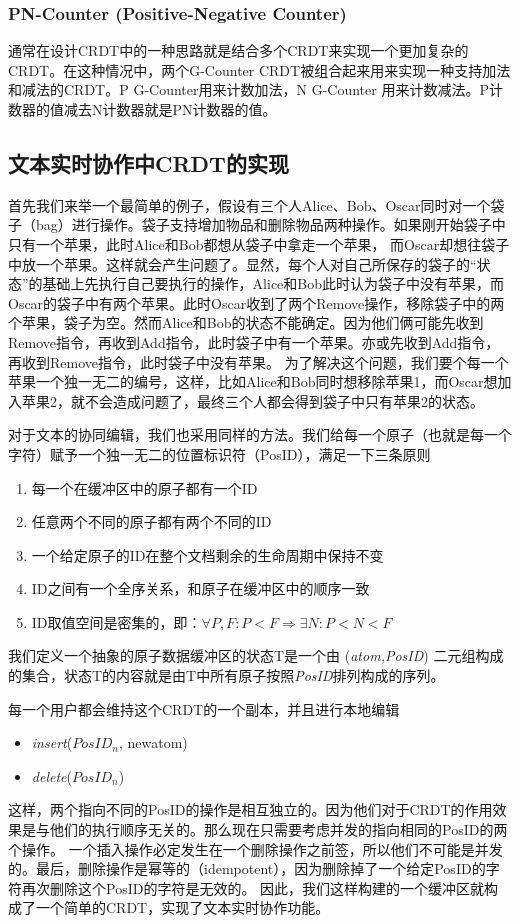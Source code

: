 \documentclass[11pt]{ctexart}
\begin{document}
\subsubsection{PN-Counter (Positive-Negative Counter)}
通常在设计CRDT中的一种思路就是结合多个CRDT来实现一个更加复杂的CRDT。在这种情况中，两个G-Counter CRDT被组合起来用来实现一种支持加法和减法的CRDT。P G-Counter用来计数加法，N G-Counter
用来计数减法。P计数器的值减去N计数器就是PN计数器的值。
\subsection{文本实时协作中CRDT的实现}
首先我们来举一个最简单的例子，假设有三个人Alice、Bob、Oscar同时对一个袋子（bag）进行操作。袋子支持增加物品和删除物品两种操作。如果刚开始袋子中只有一个苹果，此时Alice和Bob都想从袋子中拿走一个苹果，
而Oscar却想往袋子中放一个苹果。这样就会产生问题了。显然，每个人对自己所保存的袋子的“状态”的基础上先执行自己要执行的操作，Alice和Bob此时认为袋子中没有苹果，而Oscar的袋子中有两个苹果。此时Oscar收到了两个Remove操作，移除袋子中的两个苹果，袋子为空。然而Alice和Bob的状态不能确定。因为他们俩可能先收到Remove指令，再收到Add指令，此时袋子中有一个苹果。亦或先收到Add指令，再收到Remove指令，此时袋子中没有苹果。
为了解决这个问题，我们要个每一个苹果一个独一无二的编号，这样，比如Alice和Bob同时想移除苹果1，而Oscar想加入苹果2，就不会造成问题了，最终三个人都会得到袋子中只有苹果2的状态。

对于文本的协同编辑，我们也采用同样的方法。我们给每一个原子（也就是每一个字符）赋予一个独一无二的位置标识符（PosID），满足一下三条原则
\begin{enumerate}
	\item 每一个在缓冲区中的原子都有一个ID
	\item 任意两个不同的原子都有两个不同的ID
	\item 一个给定原子的ID在整个文档剩余的生命周期中保持不变
	\item ID之间有一个全序关系，和原子在缓冲区中的顺序一致
	\item ID取值空间是密集的，即：$\forall P, F : P < F \Rightarrow \exists N: P < N < F$
\end{enumerate}
我们定义一个抽象的原子数据缓冲区的状态T是一个由 (\textit{atom,PosID}) 二元组构成的集合，状态T的内容就是由T中所有原子按照\textit{PosID}排列构成的序列。 

每一个用户都会维持这个CRDT的一个副本，并且进行本地编辑
\begin{itemize}
	\item \textit{insert}($\mathit{PosID_{n}}$, newatom)
	\item \textit{delete}($\mathit{PosID_{n}}$)
\end{itemize}
这样，两个指向不同的PosID的操作是相互独立的。因为他们对于CRDT的作用效果是与他们的执行顺序无关的。那么现在只需要考虑并发的指向相同的PosID的两个操作。
一个插入操作必定发生在一个删除操作之前签，所以他们不可能是并发的。最后，删除操作是幂等的（idempotent），因为删除掉了一个给定PosID的字符再次删除这个PosID的字符是无效的。
因此，我们这样构建的一个缓冲区就构成了一个简单的CRDT，实现了文本实时协作功能。
\end{document}
